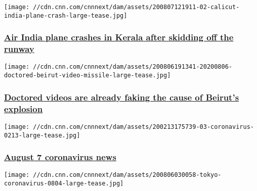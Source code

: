 \href{/2020/08/07/asia/plane-crash-calicut-india-intl/index.html}{}

\texttt{[image: //cdn.cnn.com/cnnnext/dam/assets/200807121911-02-calicut-india-plane-crash-large-tease.jpg]}

\hypertarget{air-india-plane-crashes-in-kerala-after-skidding-off-the-runway-1}{%
\subsubsection{\texorpdfstring{\href{/2020/08/07/asia/plane-crash-calicut-india-intl/index.html}{Air
India plane crashes in Kerala after skidding off the
runway}}{Air India plane crashes in Kerala after skidding off the runway}}\label{air-india-plane-crashes-in-kerala-after-skidding-off-the-runway-1}}

\href{/2020/08/06/world/fake-beirut-video-missile-intl-trnd/index.html}{}

\texttt{[image: //cdn.cnn.com/cnnnext/dam/assets/200806191341-20200806-doctored-beirut-video-missile-large-tease.jpg]}

\hypertarget{doctored-videos-are-already-faking-the-cause-of-beiruts-explosion}{%
\subsubsection{\texorpdfstring{\href{/2020/08/06/world/fake-beirut-video-missile-intl-trnd/index.html}{Doctored
videos are already faking the cause of Beirut's
explosion}}{Doctored videos are already faking the cause of Beirut's explosion}}\label{doctored-videos-are-already-faking-the-cause-of-beiruts-explosion}}

\href{/world/live-news/coronavirus-pandemic-08-07-20-intl/index.html}{}

\texttt{[image: //cdn.cnn.com/cnnnext/dam/assets/200213175739-03-coronavirus-0213-large-tease.jpg]}

\hypertarget{august-7-coronavirus-news}{%
\subsubsection{\texorpdfstring{\href{/world/live-news/coronavirus-pandemic-08-07-20-intl/index.html}{August
7 coronavirus
news}}{August 7 coronavirus news}}\label{august-7-coronavirus-news}}

\href{/2020/08/07/asia/tokyo-coronavirus-fatigue-intl-hnk/index.html}{}

\texttt{[image: //cdn.cnn.com/cnnnext/dam/assets/200806030058-tokyo-coronavirus-0804-large-tease.jpg]}

